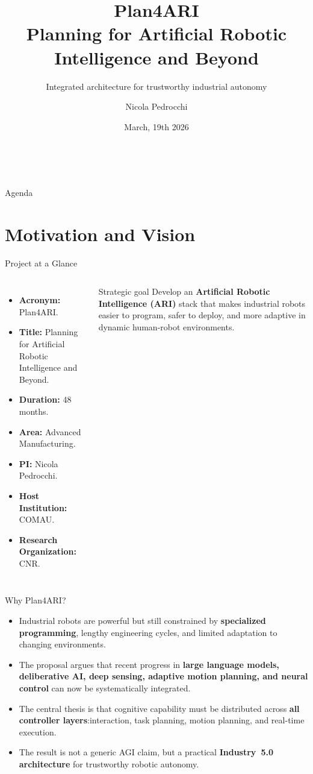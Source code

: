 \documentclass[aspectratio=169,10pt]{beamer}
\title[Plan4ARI]{Plan4ARI\\\large Planning for Artificial Robotic Intelligence and Beyond}
\subtitle{Integrated architecture for trustworthy industrial autonomy}
\author{Nicola Pedrocchi}
\institute{COMAU \and CNR}
\date{March, 19th 2026}
\begin{document}
\begin{frame}
  \titlepage\
\end{frame}
\begin{frame}{Agenda}

\tableofcontents

\end{frame}


\section{Motivation and Vision}

\begin{frame}{Project at a Glance}

\begin{columns}[T,totalwidth=\textwidth]
\begin{itemize}
  \item \textbf{Acronym:} Plan4ARI.\@
  \item \textbf{Title:} Planning for Artificial Robotic Intelligence and Beyond.
  \item \textbf{Duration:} 48 months.
  \item \textbf{Area:} Advanced Manufacturing.
  \item \textbf{PI:} Nicola Pedrocchi.
  \item \textbf{Host Institution:} COMAU.\@
  \item \textbf{Research Organization:} CNR.\@
\end{itemize}
\column{0.40\textwidth}
\begin{block}{Strategic goal}
Develop an \textbf{Artificial Robotic Intelligence (ARI)} stack that makes industrial robots easier to program, safer to deploy, and more adaptive in dynamic human-robot environments.
\end{block}
\end{columns}

\end{frame}


\begin{frame}{Why Plan4ARI?}

\begin{itemize}
  \item Industrial robots are powerful but still constrained by \textbf{specialized programming}, lengthy engineering cycles, and limited adaptation to changing environments.
  \item The proposal argues that recent progress in \textbf{large language models, deliberative AI, deep sensing, adaptive motion planning, and neural control} can now be systematically integrated.
  \item The central thesis is that cognitive capability must be distributed across \textbf{all controller layers}:\@user interaction, task planning, motion planning, and real-time execution.
  \item The result is not a generic AGI claim, but a practical \textbf{Industry~5.0 architecture} for trustworthy robotic autonomy.
\end{itemize}

\end{frame}
\end{document}
